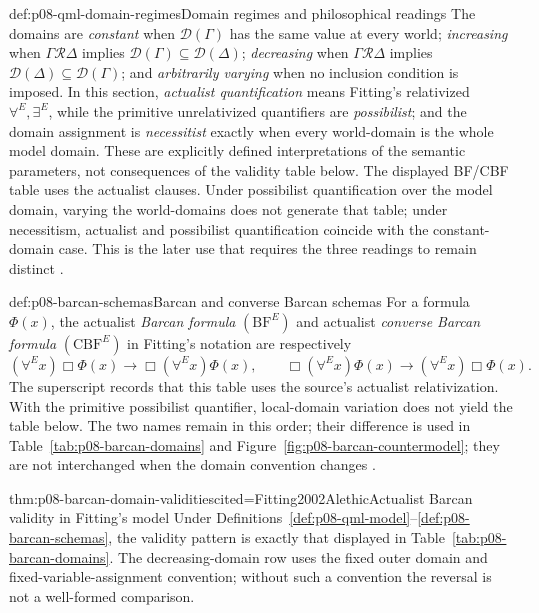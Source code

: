 \begin{hbdefinition}{def:p08-qml-domain-regimes}{Domain regimes and philosophical readings}
The domains are \emph{constant} when \(\mathcal D(\Gamma)\) has the same
value at every world; \emph{increasing} when
\(\Gamma\mathcal R\Delta\) implies
\(\mathcal D(\Gamma)\subseteq\mathcal D(\Delta)\);
\emph{decreasing} when \(\Gamma\mathcal R\Delta\) implies
\(\mathcal D(\Delta)\subseteq\mathcal D(\Gamma)\); and
\emph{arbitrarily varying} when no inclusion condition is imposed.  In this
section, \emph{actualist quantification} means Fitting's relativized
\(\forall^E,\exists^E\), while the primitive unrelativized quantifiers are
\emph{possibilist}; and the domain assignment is \emph{necessitist} exactly
when every world-domain is the whole model domain.  These are explicitly defined
interpretations of the semantic parameters, not consequences of the validity
table below.  The displayed BF/CBF table uses the actualist clauses.  Under
possibilist quantification over the model domain, varying the world-domains does not
generate that table; under necessitism, actualist and possibilist
quantification coincide with the constant-domain case.  This is the later use
that requires the three readings to remain distinct \cite{Williamson2013}.
\end{hbdefinition}

\begin{hbdefinition}{def:p08-barcan-schemas}{Barcan and converse Barcan schemas}
For a formula \(\Phi(x)\), the actualist \emph{Barcan formula}
\((\mathrm{BF}^{E})\) and actualist \emph{converse Barcan formula}
\((\mathrm{CBF}^{E})\) in Fitting's notation are respectively
\[
 (\forall^{E}x)\Box\Phi(x)\to\Box(\forall^{E}x)\Phi(x),
 \qquad
 \Box(\forall^{E}x)\Phi(x)\to(\forall^{E}x)\Box\Phi(x).
\]
The superscript records that this table uses the source's actualist
relativization.  With the primitive possibilist quantifier, local-domain
variation does not yield the table below.  The two names remain in this order;
their difference
is used in Table~\ref{tab:p08-barcan-domains} and
Figure~\ref{fig:p08-barcan-countermodel}; they are not interchanged when the
domain convention changes \cite{Barcan1946}.
\end{hbdefinition}

\begin{hbtheorem}{thm:p08-barcan-domain-validities}{cited=Fitting2002Alethic}{Actualist Barcan validity in Fitting's model}
Under Definitions~\ref{def:p08-qml-model}--\ref{def:p08-barcan-schemas}, the
validity pattern is exactly that displayed in
Table~\ref{tab:p08-barcan-domains}.  The decreasing-domain row uses the fixed
outer domain and fixed-variable-assignment convention; without such a convention the
reversal is not a well-formed comparison.
\end{hbtheorem}

